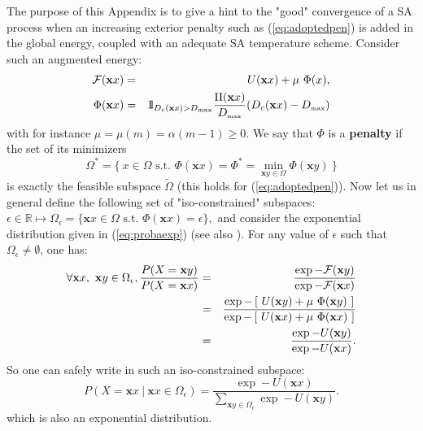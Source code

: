 \documentclass[draftcls,onecolumn]{IEEEtran}
\theoremstyle{plain}
\theoremstyle{definition}
\def\config{\mathbf{x}}
\def\objective{{\Pi}} \def\constraint{{\cal D}}
\def\constraintmax{D_{\mbox{{\tiny max}}}}
\def\multiplier{\mu}
\def\augmented{{\cal F}}
\def\objective{{\Pi}} \def\constraint{D_c} \def\constraintmax{D_{\mbox{{\tiny max}}}}
\def\potential{\Phi}
\def\multiplier{\mu}
\def\augmented{{\cal F}}
\def\Real{\mathbb{R}}
\def\st{\mbox{ s.t. }} \def\ie{\mbox{\em i.e., }} \def\wrt{\mbox{\em wrt. }}
\def\Real{\mathbb{R}}
\def\st{\mbox{ s.t. }} \def\ie{\mbox{\em i.e., }}
\def\potential{\Phi}
\def\bbbone{{\mathchoice {\rm 1\mskip-4mu l} {\rm 1\mskip-4mu l} {\rm
1\mskip-4.5mu l} {\rm 1\mskip-5mu l}}}
\def\charact{\bbbone}
\def\cond{\ |\ }
\begin{document}
The purpose of this Appendix is to give a hint to the "good" convergence 
of a SA process when an increasing exterior penalty 
such as (\ref{eq:adoptedpen}) is added in the global energy, 
coupled with an adequate SA temperature scheme. 
Consider such an augmented energy:
\begin{eqnarray}
\augmented(\config{x})&=&U(\config{x})  + \mu\ \potential(x), \\
\potential(\config{x})&=&\charact_{\constraint(\config{x}) > \constraintmax}\dfrac{\objective(\config{x})}{\constraintmax}(\constraint(\config{x}) - \constraintmax)
\end{eqnarray}
with for instance $\multiplier = \multiplier(m) = \alpha (m-1) \geq 0$.
We say that 
$\potential$ 
is a {\bf penalty} if the set of its minimizers
\begin{equation}
\Omega^* 
= \{\ x \in \Omega \st  \potential(\config{x}) 
= \potential^*= \min_{\config{y} \in \Omega} \potential(\config{y}) \ \}
\label{ms-minimizers:eq}
\end{equation}
is exactly the feasible subspace $\tilde{\Omega}$
(this holds for 
(\ref{eq:adoptedpen})). Now let us in general define the following set of "iso-constrained" subspaces:
$
\epsilon \in \Real 
\mapsto
\Omega_{\epsilon} = \{ \config{x} \in \Omega \st \potential(\config{x})  = \epsilon \}
,
$
and consider the exponential distribution
given in (\ref{eq:probaexp}) (see also \cite{geman-graffigne}).
For any value of
$\epsilon$ 
such that
$\Omega_\epsilon \neq \emptyset$,
one has:
\begin{eqnarray}
\forall \config{x},\ \config{y} \in \Omega_{\epsilon}, \dfrac{P(X = \config{y})}{P(X = \config{x})} &=&\dfrac{\exp -\augmented(\config{y})}{\exp -\augmented(\config{x})} \notag \\
&=&\dfrac {\exp - \left[\ U(\config{y}) +\multiplier\ \potential(\config{y})\ \right]}{\exp - \left[\ U(\config{x}) + \multiplier\ \potential(\config{x}) \ \right]} \notag \\
&=&\dfrac {\exp - U(\config{y})}{\exp - U(\config{x}) }.
\end{eqnarray}
So one can safely write in such an iso-constrained subspace:
\begin{equation}
P(X = \config{x} \cond \config{x} \in \Omega_{\epsilon}) = 
\dfrac {\exp - U(\config{x}) }{ \sum_{\config{y} \in \Omega_{\epsilon}} \exp - U(\config{y})}.
\label{ms-exponential:eq}
\end{equation}
which is also an exponential distribution. 
\end{document}
